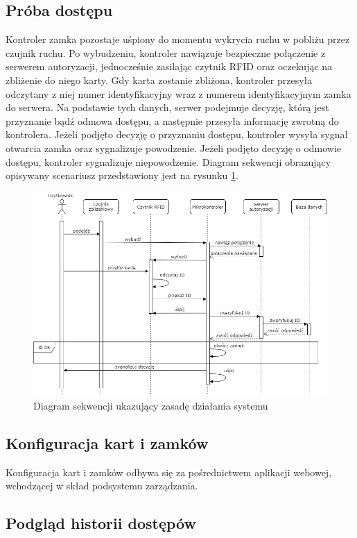                 \subsection{Próba dostępu}
                        Kontroler zamka pozostaje uśpiony do momentu wykrycia ruchu w pobliżu przez czujnik ruchu. Po wybudzeniu, kontroler nawiązuje bezpieczne połączenie z serwerem autoryzacji, jednocześnie zasilając czytnik RFID oraz oczekując na zbliżenie do niego karty. Gdy karta zostanie zbliżona, kontroler przesyła odczytany z niej numer identyfikacyjny wraz z numerem identyfikacyjnym zamka do serwera. Na podstawie tych danych, serwer podejmuje decyzję, którą jest przyznanie bądź odmowa dostępu, a następnie przesyła informację zwrotną do kontrolera. Jeżeli podjęto decyzję o przyznaniu dostępu, kontroler wysyła sygnał otwarcia zamka oraz sygnalizuje powodzenie. Jeżeli podjęto decyzję o odmowie dostępu, kontroler sygnalizuje niepowodzenie. Diagram sekwencji obrazujący opisywany scenariusz przedstawiony jest na rysunku \ref{fig:sequence1}.

                        \begin{figure}[]
                                \includegraphics[width=\linewidth]{chapters/images/sequence1.png}
                                \caption{Diagram sekwencji ukazujący zasadę działania systemu}
                                \label{fig:sequence1}
                        \end{figure}

                \subsection{Konfiguracja kart i zamków}
                        Konfiguracja kart i zamków odbywa się za pośrednictwem aplikacji webowej, wchodzącej w skład podsystemu zarządzania.

                \subsection{Podgląd historii dostępów}

